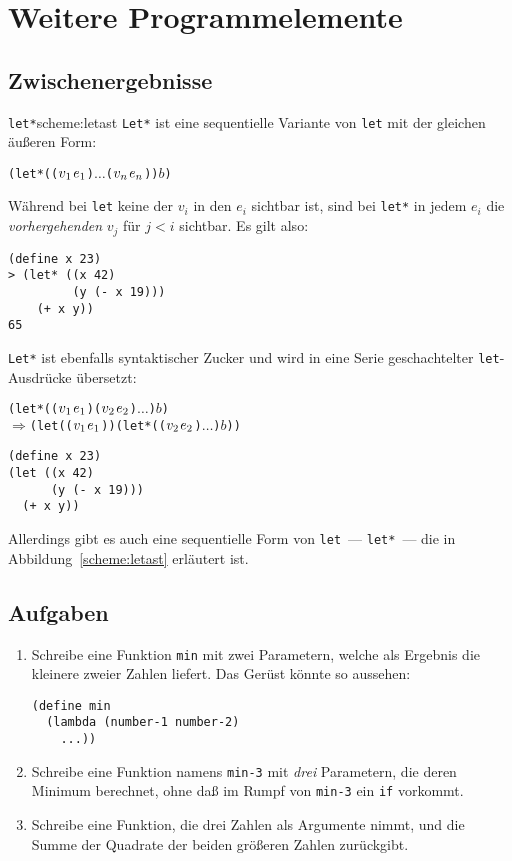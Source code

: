 \chapter{Weitere Programmelemente}
\label{cha:elements}

\section{Zwischenergebnisse}

\begin{feature}{\texttt{let*}}{scheme:letast}
\texttt{Let*} ist eine sequentielle
Variante von \texttt{let} mit der gleichen äußeren Form:
%
\begin{alltt}
(let* ((\(v\sb{1}\) \(e\sb{1}\)) \(\ldots\) (\(v\sb{n}\) \(e\sb{n}\))) \(b\))
\end{alltt}
%
Während bei \texttt{let} keine der $v_i$ in den $e_i$ sichtbar ist,
sind bei \texttt{let*} in jedem $e_i$ die \emph{vorhergehenden} $v_j$
für $j<i$ sichtbar.  Es gilt also:
%
\begin{verbatim}
(define x 23)
> (let* ((x 42)
         (y (- x 19)))
    (+ x y))
65
\end{verbatim}
%
\texttt{Let*} ist ebenfalls syntaktischer Zucker und wird in eine
Serie geschachtelter \texttt{let}-Ausdrücke übersetzt:
%
\begin{alltt}
(let* ((\(v\sb{1}\) \(e\sb{1}\)) (\(v\sb{2}\) \(e\sb{2}\)) \(\ldots\)) \(b\))
\(\Longrightarrow\) (let ((\(v\sb{1}\) \(e\sb{1}\))) (let* ((\(v\sb{2}\) \(e\sb{2}\)) \(\ldots\)) \(b\)))
\end{alltt}
\end{feature}
%
\begin{verbatim}
(define x 23)
(let ((x 42)
      (y (- x 19)))
  (+ x y))
\end{verbatim}
%
Allerdings gibt es auch eine sequentielle Form von \texttt{let}~---
\texttt{let*}~--- die in Abbildung~\ref{scheme:letast} erläutert ist.
\section*{Aufgaben}

\begin{aufgabe}
\begin{enumerate}\item
  Schreibe eine Funktion \texttt{min} mit zwei Parametern, welche als
  Ergebnis die kleinere zweier Zahlen liefert.  Das Gerüst könnte so
  aussehen:
\begin{verbatim}
(define min
  (lambda (number-1 number-2)
    ...))
\end{verbatim}
\item Schreibe eine Funktion namens \texttt{min-3} mit \emph{drei}
  Parametern, die deren Minimum berechnet, ohne daß im Rumpf von
  \texttt{min-3} ein \texttt{if} vorkommt.
\item
  Schreibe eine Funktion, die drei Zahlen als Argumente nimmt, und die
  Summe der Quadrate der beiden größeren Zahlen zurückgibt.
\end{enumerate}
\end{aufgabe}

